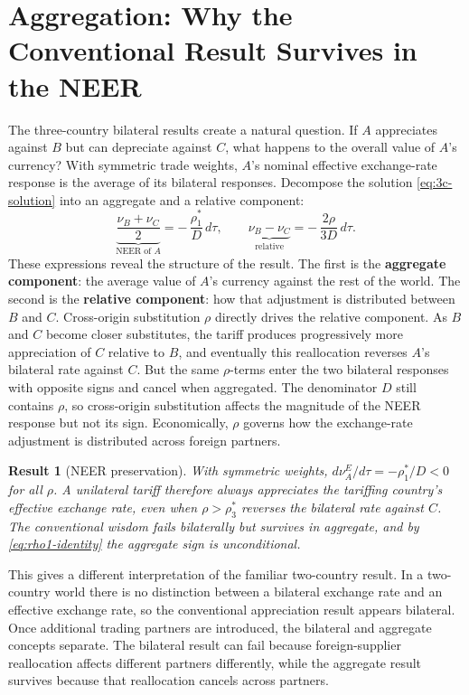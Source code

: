 \documentclass[11pt]{article}
\newtheorem{result}{Result}[section]
\begin{document}
\section{Aggregation: Why the Conventional Result Survives in the NEER}

The three-country bilateral results create a natural question. If $A$ appreciates against $B$ but can depreciate against $C$, what happens to the overall value of $A$'s currency? With symmetric trade weights, $A$'s nominal effective exchange-rate response is the average of its bilateral responses. Decompose the solution \eqref{eq:3c-solution} into an aggregate and a relative component:
\begin{equation}
\underbrace{\frac{\nu_B + \nu_C}{2}}_{\text{NEER of } A}
= -\,\frac{\rho_1^*}{D}\, d\tau,
\qquad
\underbrace{\nu_B - \nu_C}_{\text{relative}}
= -\,\frac{2\rho}{3D}\, d\tau .
\label{eq:3c-decomp}
\end{equation}
These expressions reveal the structure of the result. The first is the \textbf{aggregate component}: the average value of $A$'s currency against the rest of the world. The second is the \textbf{relative component}: how that adjustment is distributed between $B$ and $C$. Cross-origin substitution $\rho$ directly drives the relative component. As $B$ and $C$ become closer substitutes, the tariff produces progressively more appreciation of $C$ relative to $B$, and eventually this reallocation reverses $A$'s bilateral rate against $C$. But the same $\rho$-terms enter the two bilateral responses with opposite signs and cancel when aggregated. The denominator $D$ still contains $\rho$, so cross-origin substitution affects the magnitude of the NEER response but not its sign. Economically, $\rho$ governs how the exchange-rate adjustment is distributed across foreign partners.

\begin{result}[NEER preservation]
With symmetric weights, $d\nu_A^E/d\tau = -\rho_1^*/D < 0$ for all $\rho$. A unilateral tariff therefore always appreciates the tariffing country's effective exchange rate, even when $\rho > \rho_3^*$ reverses the bilateral rate against $C$. The conventional wisdom fails bilaterally but survives in aggregate, and by \eqref{eq:rho1-identity} the aggregate sign is unconditional.
\end{result}

This gives a different interpretation of the familiar two-country result. In a two-country world there is no distinction between a bilateral exchange rate and an effective exchange rate, so the conventional appreciation result appears bilateral. Once additional trading partners are introduced, the bilateral and aggregate concepts separate. The bilateral result can fail because foreign-supplier reallocation affects different partners differently, while the aggregate result survives because that reallocation cancels across partners.
\end{document}
